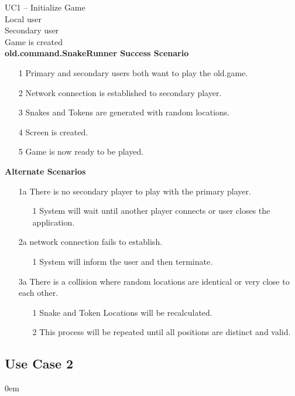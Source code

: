 \documentclass[titlepage]{article}
\begin{document}
			\textbf{} UC1 -- Initialize Game\\
			\textbf{} Local user\\
			\textbf{} Secondary user\\
			\textbf{} Game is created\\
			\textbf{old.command.SnakeRunner Success Scenario}
				\begin{enumerate}
					\itemsep0em 
					\item[1] Primary and secondary users both want to play the old.game.
					\item[2] Network connection is established to secondary player.
					\item[3] Snakes and Tokens are generated with random locations.
					\item[4] Screen is created.
					\item[5] Game is now ready to be played.
				\end{enumerate}
			\textbf{Alternate Scenarios}
			\begin{enumerate}
									\itemsep0em 
				\item[1a]There is no secondary player to play with the primary player.
				\begin{enumerate}
										\itemsep0em 
					\item[1]System will wait until another player connects or user closes the application.
				\end{enumerate}
				\item[2a]network connection fails to establish.
				\begin{enumerate}
										\itemsep0em 
					\item[1]System will inform the user and then terminate.
				\end{enumerate}
				\item[3a]There is a collision where random locations are identical or very close to each other.
				\begin{enumerate}
										\itemsep0em 
					\item[1]Snake and Token Locations will be recalculated.
					\item[2]This process will be repeated until all positions are distinct and valid.
				\end{enumerate}
			\end{enumerate}
		
	\subsection{Use Case 2}
	\itemsep0em 
	
\end{document}
